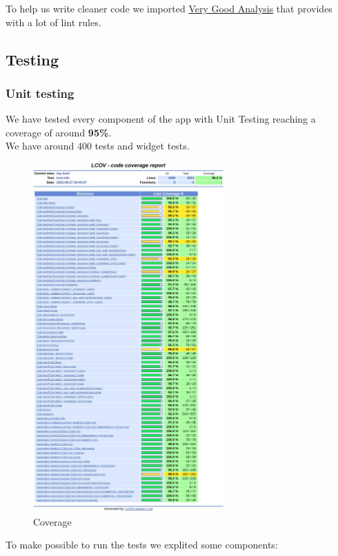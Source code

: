 \documentclass{article}
\begin{document}
To help us write cleaner code we imported \href{https://pub.dev/packages/very_good_analysis}{Very Good Analysis} that provides with a lot of lint rules.

\newpage
\subsection{Testing}

\subsubsection{Unit testing}
We have tested every component of the app with Unit Testing reaching a coverage of around \textbf{95\%}. \\
We have around 400 tests and widget tests.

\begin{figure}[!htb]
	\centering
	\includegraphics[width=0.65\textwidth]{assets/images/lcov-report.png}
	\caption{Coverage}
\end{figure}
\clearpage
To make possible to run the tests we explited some components:
\end{document}
